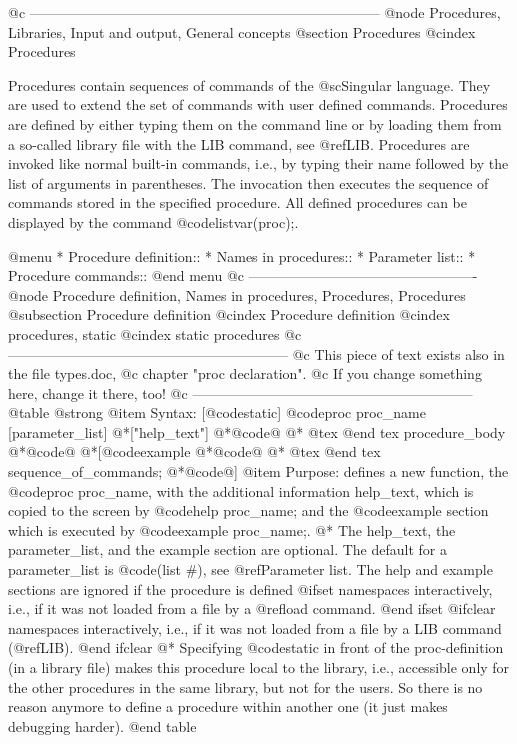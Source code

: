{{{@c ---------------------------------------------------------------------------
@node Procedures, Libraries, Input and output, General concepts
@section Procedures
@cindex Procedures

Procedures contain sequences of commands of the @sc{Singular} language.
They are used to extend
the set of commands with user defined commands.  Procedures are defined
by either typing them on the command line or by loading them from a
so-called library file with the LIB command, see @ref{LIB}.  Procedures are
invoked like normal built-in commands, i.e., by typing their name
followed by the list of arguments in parentheses. The invocation then
executes the sequence of commands stored in the specified procedure. All
defined procedures can be displayed by the command @code{listvar(proc);}.

@menu
* Procedure definition::
* Names in procedures::
* Parameter list::
* Procedure commands::
@end menu
@c -------------------------------------------------
@node Procedure definition, Names in procedures, Procedures, Procedures
@subsection Procedure definition
@cindex Procedure definition
@cindex procedures, static
@cindex static procedures
@c ------------------------------------------------------------
@c   This piece of text exists also in the file types.doc,
@c   chapter "proc declaration".
@c   If you change something here, change it there, too!
@c ------------------------------------------------------------
@table @strong
@item Syntax:
[@code{static}] @code{proc} proc_name [parameter_list]
@*["help_text"]
@*@code{@{}
@*
@tex
\quad
@end tex
   procedure_body
@*@code{@}}
@*[@code{example}
@*@code{@{}
@*
@tex
\quad
@end tex
   sequence_of_commands;
@*@code{@}}]
@item Purpose:
defines a new function, the @code{proc} proc_name, with the additional
information help_text, which is copied to the screen by
@code{help proc_name;} and the @code{example} section
which is executed by @code{example proc_name;}.
@* The help_text, the parameter_list, and the example section are optional.
The default for a parameter_list is @code{(list #)}, see @ref{Parameter list}.
The help and example sections are ignored if the procedure is defined
@ifset namespaces
interactively, i.e., if it was not loaded from a file by a @ref{load} command.
@end ifset
@ifclear namespaces
interactively, i.e., if it was not loaded from a file by a LIB command
(@ref{LIB}).
@end ifclear
@* Specifying @code{static} in front of the proc-definition (in a library file)
makes this procedure local to the library, i.e., accessible only for the other
procedures in the same library, but not for the users. So there is no
reason anymore to define a procedure within another one (it just makes
debugging harder).
@end table

}}}
